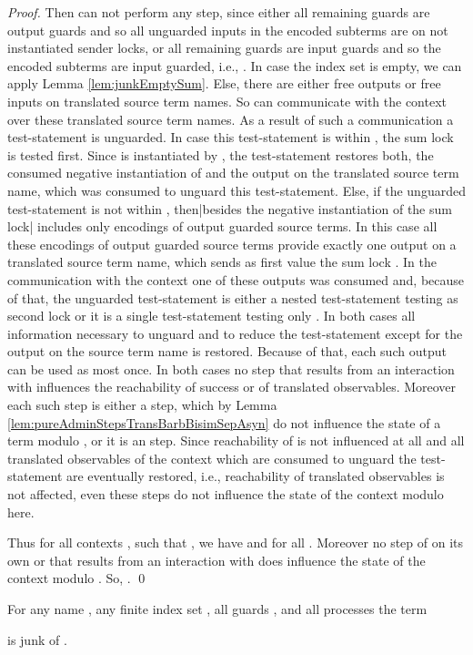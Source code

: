 \documentclass[]{llncs}
\begin{document}
\begin{proof}
	Then  can not perform any step, since either all remaining guards are output guards and so all unguarded inputs in the encoded subterms are on not instantiated sender locks, or all remaining guards are input guards and so the encoded subterms are input guarded, i.e., . In case the index set  is empty, we can apply Lemma \ref{lem:junkEmptySum}. Else, there are either free outputs or free inputs on translated source term names. So  can communicate with the context over these translated source term names. As a result of such a communication a test-statement is unguarded. In case this test-statement is within , the sum lock  is tested first. Since  is instantiated by , the test-statement restores both, the consumed negative instantiation of  and the output on the translated source term name, which was consumed to unguard this test-statement. Else, if the unguarded test-statement is not within , then|besides the negative instantiation of the sum lock| includes only encodings of output guarded source terms. In this case all these encodings of output guarded source terms provide exactly one output on a translated source term name, which sends as first value the sum lock . In the communication with the context one of these outputs was consumed and, because of that, the unguarded test-statement is either a nested test-statement testing  as second lock or it is a single test-statement testing only . In both cases all information necessary to unguard and to reduce the test-statement except for the output on the source term name is restored. Because of that, each such output can be used as most once. In both cases no step that results from an interaction with  influences the reachability of success or of translated observables. Moreover each such step is either a \pure \admin step, which by Lemma \ref{lem:pureAdminStepsTransBarbBisimSepAsyn} do not influence the state of a term modulo , or it is an \impure \admin step. Since reachability of  is not influenced at all and all translated observables of the context which are consumed to unguard the test-statement are eventually restored, i.e., reachability of translated observables is not affected, even these \impure \admin steps do not influence the state of the context modulo  here.
	
	Thus for all contexts , such that , we have  and  for all . Moreover no step of  on its own or that results from an interaction with  does influence the state of the context modulo . So, .
	\qed
\end{proof}

\begin{lemma} \label{lem:junkRemainsOfSumsMixAsyn}
	For any name , any finite index set , all guards , and all processes  the term
	
	is junk of .
\end{lemma}
\end{document}
